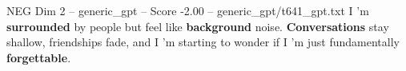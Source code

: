 \begin{textsample}{NEG Dim 2 – generic\_gpt – Score -2.00 – generic\_gpt/t641\_gpt.txt}  \label{ex:f2_neg_009}
I ’m \textbf{surrounded} by people but feel like \textbf{background} noise. \textbf{Conversations} stay shallow, friendships fade, and I ’m starting to wonder if I ’m just fundamentally \textbf{forgettable}.

\end{textsample}
